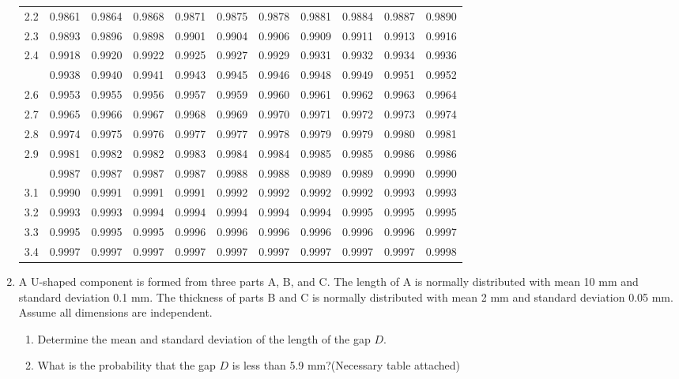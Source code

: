\documentclass[12pt,a4paper]{article}
\begin{document}
\begin{enumerate}
\begin{center}
\begin{longtable}{ccccccccccc}
2.2 & 0.9861 & 0.9864 & 0.9868 & 0.9871 & 0.9875 & 0.9878 & 0.9881 & 0.9884 & 0.9887 & 0.9890 \\
2.3 & 0.9893 & 0.9896 & 0.9898 & 0.9901 & 0.9904 & 0.9906 & 0.9909 & 0.9911 & 0.9913 & 0.9916 \\
2.4 & 0.9918 & 0.9920 & 0.9922 & 0.9925 & 0.9927 & 0.9929 & 0.9931 & 0.9932 & 0.9934 & 0.9936 \\
\addlinespace
2.5 & 0.9938 & 0.9940 & 0.9941 & 0.9943 & 0.9945 & 0.9946 & 0.9948 & 0.9949 & 0.9951 & 0.9952 \\
2.6 & 0.9953 & 0.9955 & 0.9956 & 0.9957 & 0.9959 & 0.9960 & 0.9961 & 0.9962 & 0.9963 & 0.9964 \\
2.7 & 0.9965 & 0.9966 & 0.9967 & 0.9968 & 0.9969 & 0.9970 & 0.9971 & 0.9972 & 0.9973 & 0.9974 \\
2.8 & 0.9974 & 0.9975 & 0.9976 & 0.9977 & 0.9977 & 0.9978 & 0.9979 & 0.9979 & 0.9980 & 0.9981 \\
2.9 & 0.9981 & 0.9982 & 0.9982 & 0.9983 & 0.9984 & 0.9984 & 0.9985 & 0.9985 & 0.9986 & 0.9986 \\
\addlinespace
3.0 & 0.9987 & 0.9987 & 0.9987 & 0.9987 & 0.9988 & 0.9988 & 0.9989 & 0.9989 & 0.9990 & 0.9990 \\
3.1 & 0.9990 & 0.9991 & 0.9991 & 0.9991 & 0.9992 & 0.9992 & 0.9992 & 0.9992 & 0.9993 & 0.9993 \\
3.2 & 0.9993 & 0.9993 & 0.9994 & 0.9994 & 0.9994 & 0.9994 & 0.9994 & 0.9995 & 0.9995 & 0.9995 \\
3.3 & 0.9995 & 0.9995 & 0.9995 & 0.9996 & 0.9996 & 0.9996 & 0.9996 & 0.9996 & 0.9996 & 0.9997 \\
3.4 & 0.9997 & 0.9997 & 0.9997 & 0.9997 & 0.9997 & 0.9997 & 0.9997 & 0.9997 & 0.9997 & 0.9998 \\
\end{longtable}
\end{center}

\item A U-shaped component is formed from three parts A, B, and C. The length of A is normally distributed with mean 10 mm and standard deviation 0.1 mm. The thickness of parts B and C is normally distributed with mean 2 mm and standard deviation 0.05 mm. Assume all dimensions are independent.
\begin{enumerate}
  \item Determine the mean and standard deviation of the length of the gap $D$.
  \item What is the probability that the gap $D$ is less than 5.9 mm?(Necessary table attached)
\end{enumerate}
\begin{center}
  \begin{tikzpicture}[
        thick,
        component/.style={
            draw, 
            pattern=crosshatch dots, 
            pattern color=gray!80,
            text=black
        }
    ]


\end{tikzpicture}
\end{center}
\end{enumerate}
\end{document}
